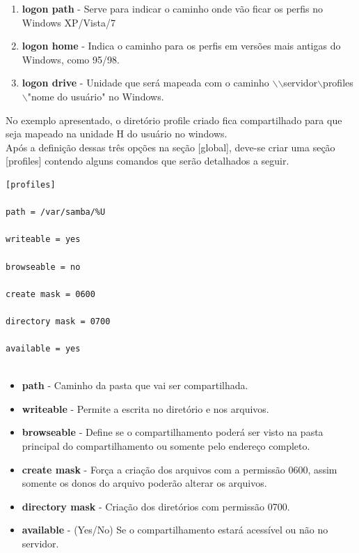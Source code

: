 \begin{enumerate}
	\item \textbf{logon path} - Serve para indicar o caminho onde vão ficar os perfis no Windows XP/Vista/7 
	\item \textbf{logon home} - Indica o caminho para os perfis em versões mais antigas do Windows, como 95/98.
	\item \textbf{logon drive} -  Unidade que será mapeada com o caminho $\backslash$$\backslash$servidor$\backslash$profiles$\backslash$"nome do usuário" no Windows.
\end{enumerate}

No exemplo apresentado, o diretório profile criado fica compartilhado para que seja mapeado na unidade H do usuário no windows.\\

Após a definição dessas três opções na seção [global], deve-se criar uma seção [profiles] contendo alguns comandos que serão detalhados a seguir.

\begin{lstlisting}	
[profiles] 

path = /var/samba/%U 
	
writeable = yes 
	
browseable = no 
	
create mask = 0600 
	
directory mask = 0700 
	
available = yes
	
\end{lstlisting}

\begin{itemize}
	\item \textbf {path} - Caminho da pasta que vai ser compartilhada.
	\item \textbf {writeable} - Permite a escrita no diretório e nos arquivos.
	\item \textbf {browseable} - Define se o compartilhamento poderá ser visto na pasta principal do compartilhamento ou somente pelo endereço completo.
	\item \textbf {create mask} - Força a criação dos arquivos com a permissão 0600, assim somente os donos do arquivo poderão alterar os arquivos.
	\item \textbf {directory mask} - Criação dos diretórios com permissão 0700.
	\item \textbf{available} - (Yes/No) Se o compartilhamento estará acessível ou não no servidor.
\end{itemize}


